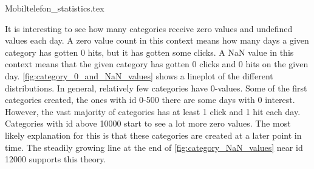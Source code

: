 {Mobiltelefon_statistics.tex}

It is interesting to see how many categories receive zero values and undefined values each day.
A zero value count in this context means how many days a given category has gotten 0 hits, but it has gotten some clicks.
A NaN value in this context means that the given category has gotten 0 clicks and 0 hits on the given day.
\autoref{fig:category_0_and_NaN_values} shows a lineplot of the different distributions.
In general, relatively few categories have 0-values. 
Some of the first categories created, the ones with id 0-500 there are some days with 0 interest.
However, the vast majority of categories has at least 1 click and 1 hit each day.
Categories with id above 10000 start to see a lot more zero values.
The most likely explanation for this is that these categories are created at a later point in time.
The steadily growing line at the end of \autoref{fig:category_NaN_values} near id 12000 supports this theory.
